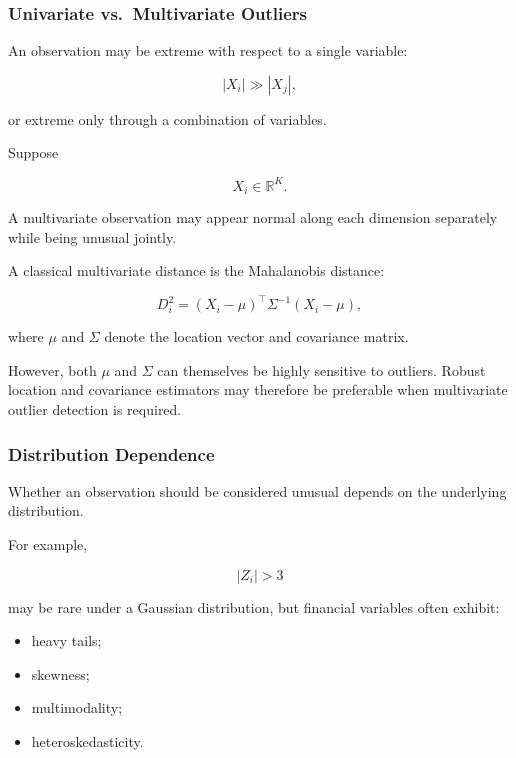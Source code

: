 \documentclass[11pt,a4paper]{article}
\begin{document}
\subsubsection{Univariate vs.\ Multivariate Outliers}

An observation may be extreme with respect to a single variable:

\begin{equation}
|X_i|
\gg
|X_j|,
\end{equation}

or extreme only through a combination of variables.

Suppose

\begin{equation}
X_i
\in
\mathbb{R}^{K}.
\end{equation}

A multivariate observation may appear normal along each dimension separately
while being unusual jointly.

A classical multivariate distance is the Mahalanobis distance:

\begin{equation}
\boxed{
D_i^2
=
(X_i-\mu)^\top
\Sigma^{-1}
(X_i-\mu),
}
\end{equation}

where $\mu$ and $\Sigma$ denote the location vector and covariance matrix.

However, both $\mu$ and $\Sigma$ can themselves be highly sensitive to
outliers. Robust location and covariance estimators may therefore be preferable
when multivariate outlier detection is required.


\subsubsection{Distribution Dependence}

Whether an observation should be considered unusual depends on the underlying
distribution.

For example,

\begin{equation}
|Z_i|>3
\end{equation}

may be rare under a Gaussian distribution, but financial variables often
exhibit:

\begin{itemize}
    \item heavy tails;
    \item skewness;
    \item multimodality;
    \item heteroskedasticity.
\end{itemize}
\end{document}
